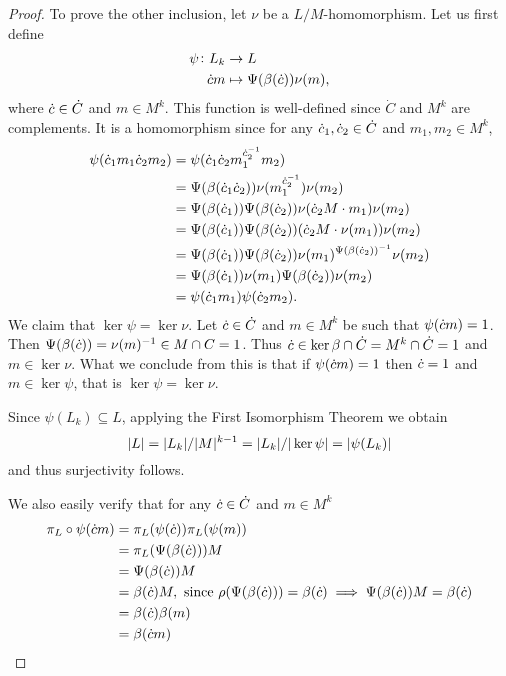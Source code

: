 \begin{proof}
    To prove the other inclusion, let $\nu$ be a $L/M$-homomorphism. 
    Let us first define
    \begin{align*}
        \psi \colon L_k &\rightarrow L \\
                \dot{c} m &\mapsto \Psi(\beta(\dot{c}))\nu(m),
    \end{align*}
    where $\dot{c} \in \dot C$ and $m \in M^k$.
    This function is well-defined since $\dot{C}$ and $M^k$ are complements. It is a homomorphism since for any $\dot{c}_1, \dot{c}_2 \in \dot{C}$ and $m_1, m_2 \in M^k$,
    \begin{align*}
        \psi(\dot{c}_1 m_1 \dot{c}_2 m_2) &= \psi(\dot{c}_1 \dot{c}_2 m_1^{\dot{c}_2^{-1}} m_2) \\
        &= \Psi(\beta(\dot{c}_1 \dot{c}_2)) \nu(m_1^{\dot{c}_2^{-1}}) \nu(m_2) \\
        &= \Psi(\beta(\dot{c}_1)) \Psi(\beta(\dot{c}_2)) \nu(\dot{c}_2M \cdot m_1) \nu(m_2) \\
        &= \Psi(\beta(\dot{c}_1)) \Psi(\beta(\dot{c}_2)) (\dot{c}_2M \cdot \nu(m_1)) \nu(m_2) \\
        &= \Psi(\beta(\dot{c}_1)) \Psi(\beta(\dot{c}_2)) \nu(m_1)^{\Psi(\beta(\dot{c}_2))^{-1}} \nu(m_2) \\
        &= \Psi(\beta(\dot{c}_1)) \nu(m_1) \Psi(\beta(\dot{c}_2)) \nu(m_2) \\
        &= \psi(\dot{c}_1 m_1) \psi(\dot{c}_2 m_2).
    \end{align*}
    We claim that $\ker \psi = \ker \nu$. Let $\dot{c} \in \dot{C}$ and $m \in M^k$ be such that $\psi(\dot{c} m) = 1$. Then
    $\Psi(\beta(\dot{c})) = \nu(m)^{-1} \in M \cap C = 1$. Thus $\dot{c} \in \ker \beta \cap \dot{C} = M^{k} \cap \dot{C} = 1$ and $m \in \ker \nu$. What we conclude from this is that if $\psi(\dot{c} m) = 1$ then $\dot{c} = 1$ and $m \in \ker \psi$, that is $\ker \psi = \ker \nu$.

    Since $\psi(L_k) \subseteq L$, applying the First Isomorphism Theorem we obtain 
    $$
    | L | = | L_k |/| M |^{k-1} = | L_k |/| \ker \psi | = | \psi(L_k) |
    $$ 
    and thus surjectivity follows.
        
    We also easily verify that for any $\dot{c} \in \dot{C}$ and $m \in M^k$
    \begin{align*}
        \pi_L \circ \psi(\dot{c} m) &= \pi_L(\psi(\dot{c}))\pi_L(\psi(m)) \\
        &= \pi_L(\Psi(\beta(\dot{c})))M \\
        &= \Psi(\beta(\dot{c}))M \\
        &= \beta(\dot{c})M, \text{ since $\rho(\Psi(\beta(\dot{c}))) = \beta(\dot{c}) \implies \Psi(\beta(\dot{c}))M = \beta(\dot{c})$} \\
        &= \beta(\dot{c})\beta(m) \\
        &= \beta(\dot{c} m)    
    \end{align*}
    
    \end{proof}

